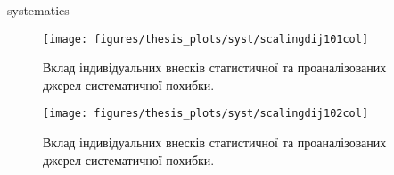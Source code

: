 systematics
\begin{figure}[p]
	\centering
		\texttt{[image: figures/thesis\_plots/syst/scalingdij101col]}
	\caption{Вклад індивідуальних внесків статистичної та проаналізованих джерел систематичної похибки.}
	\label{fig:scalingdij101col}
\end{figure}

\begin{figure}[p]
	\centering
		\texttt{[image: figures/thesis\_plots/syst/scalingdij102col]}
	\caption{Вклад індивідуальних внесків статистичної та проаналізованих джерел систематичної похибки.}
	\label{fig:scalingdij101col}
\end{figure}
